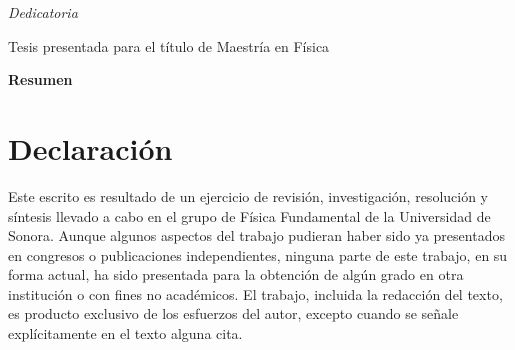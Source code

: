\newpage
\thispagestyle{empty}
\begin{center}
 \vspace*{2cm}
  \textit{\LARGE {Dedicatoria}}\\
  
\end{center}


\newpage
\thispagestyle{empty}
\begin{center}
  \textbf{\Large \thesistitle}

  \vspace*{1cm}
  \textbf{\large \minombre}

  \vspace*{0.5cm}
  {\large Tesis presentada para el título de Maestría en Física\\ \mespresentado}

  \vspace*{1cm}
  \textbf{\large Resumen}
\end{center}


\chapter*{Declaración}
Este escrito es resultado de un ejercicio de
revisión, investigación, resolución  y síntesis  llevado a cabo en el
grupo de Física Fundamental de la Universidad de Sonora. Aunque
algunos aspectos del trabajo pudieran haber sido ya presentados en
congresos o publicaciones independientes, ninguna parte de este trabajo,
en su forma actual, ha sido presentada para la obtención de algún grado
en otra  institución o con fines no académicos.
El trabajo, incluida la redacción del texto, es producto exclusivo de
los esfuerzos del autor, excepto cuando se señale explícitamente en el
texto alguna cita.



